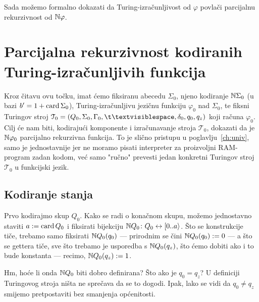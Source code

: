 Sada možemo formalno dokazati da Turing-izračunljivost od $\varphi$ povlači parcijalnu rekurzivnost od ${\mathbb N}\varphi$.

\section{Parcijalna rekurzivnost kodiranih Turing-izračunljivih funkcija}

Kroz čitavu ovu točku, imat ćemo fiksiranu abecedu $\Sigma_0$, njeno kodiranje ${\mathbb N}\Sigma_0$ (u bazi $b'=1+\operatorname{card}\Sigma_0$), Turing-izračunljivu jezičnu funkciju $\varphi_0$ nad $\Sigma_0$, te fiksni Turingov stroj $\mathcal T_0=(Q_0,\Sigma_0,\Gamma_0,\bl,\delta_0,q_0,q_z)$ koji računa $\varphi_0$. Cilj će nam biti, kodirajući komponente i izračunavanje stroja $\mathcal T_0$, dokazati da je ${\mathbb N}\varphi_0$ parcijalno rekurzivna funkcija. To je slično pristupu u poglavlju~\ref{ch:univ}, samo je jednostavnije jer ne moramo pisati interpreter za proizvoljni RAM-program zadan kodom, već samo "ručno" prevesti jedan konkretni Turingov stroj $\mathcal T_0$ u funkcijski jezik.

\subsection{Kodiranje stanja}

Prvo kodirajmo skup $Q_0$. Kako se radi o konačnom skupu, možemo jednostavno staviti $a:=\operatorname{card} Q_0$ i fiksirati bijekciju ${\mathbb N} Q_0\colon Q_0\leftrightarrow[0..a\rangle$. Što se konstrukcije tiče, trebamo samo fiksirati ${\mathbb N} Q_0(q_0)$ --- prirodnim se čini ${\mathbb N} Q_0(q_0):=0$ --- a što se gettera tiče, sve što trebamo je usporedba s ${\mathbb N} Q_0(q_z)$, što ćemo dobiti ako i to bude konstanta --- recimo, ${\mathbb N} Q_0(q_z):=1$.

Hm, hoće li onda ${\mathbb N} Q_0$ biti dobro definirana? Što ako je $q_0=q_z$? U definiciji Turingovog stroja ništa ne sprečava da se to dogodi. Ipak, lako se vidi da $q_0\not=q_z$ smijemo pretpostaviti bez smanjenja općenitosti.


